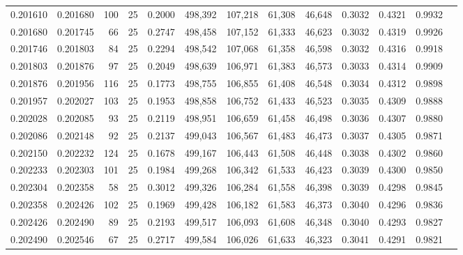 \begin{tabular}{rrrrrrrrrrrrr}
0.201610 & 0.201680 &   100 &  25 &                                     0.2000 & 498,392 & 107,218 &  61,308 &  46,648 & 0.3032 & 0.4321 & 0.9932 \\
0.201680 & 0.201745 &    66 &  25 &                                     0.2747 & 498,458 & 107,152 &  61,333 &  46,623 & 0.3032 & 0.4319 & 0.9926 \\
0.201746 & 0.201803 &    84 &  25 &                                     0.2294 & 498,542 & 107,068 &  61,358 &  46,598 & 0.3032 & 0.4316 & 0.9918 \\
0.201803 & 0.201876 &    97 &  25 &                                     0.2049 & 498,639 & 106,971 &  61,383 &  46,573 & 0.3033 & 0.4314 & 0.9909 \\
0.201876 & 0.201956 &   116 &  25 &                                     0.1773 & 498,755 & 106,855 &  61,408 &  46,548 & 0.3034 & 0.4312 & 0.9898 \\
0.201957 & 0.202027 &   103 &  25 &                                     0.1953 & 498,858 & 106,752 &  61,433 &  46,523 & 0.3035 & 0.4309 & 0.9888 \\
0.202028 & 0.202085 &    93 &  25 &                                     0.2119 & 498,951 & 106,659 &  61,458 &  46,498 & 0.3036 & 0.4307 & 0.9880 \\
0.202086 & 0.202148 &    92 &  25 &                                     0.2137 & 499,043 & 106,567 &  61,483 &  46,473 & 0.3037 & 0.4305 & 0.9871 \\
0.202150 & 0.202232 &   124 &  25 &                                     0.1678 & 499,167 & 106,443 &  61,508 &  46,448 & 0.3038 & 0.4302 & 0.9860 \\
0.202233 & 0.202303 &   101 &  25 &                                     0.1984 & 499,268 & 106,342 &  61,533 &  46,423 & 0.3039 & 0.4300 & 0.9850 \\
0.202304 & 0.202358 &    58 &  25 &                                     0.3012 & 499,326 & 106,284 &  61,558 &  46,398 & 0.3039 & 0.4298 & 0.9845 \\
0.202358 & 0.202426 &   102 &  25 &                                     0.1969 & 499,428 & 106,182 &  61,583 &  46,373 & 0.3040 & 0.4296 & 0.9836 \\
0.202426 & 0.202490 &    89 &  25 &                                     0.2193 & 499,517 & 106,093 &  61,608 &  46,348 & 0.3040 & 0.4293 & 0.9827 \\
0.202490 & 0.202546 &    67 &  25 &                                     0.2717 & 499,584 & 106,026 &  61,633 &  46,323 & 0.3041 & 0.4291 & 0.9821 \\

\end{tabular}
